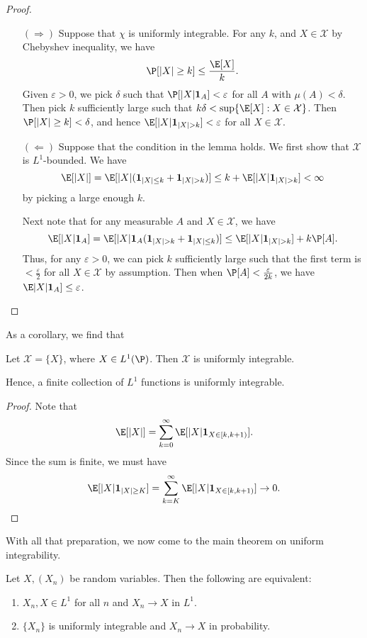 \documentclass[a4paper]{article}
\begin{document}
\begin{proof}\leavevmode
  \begin{itemize}
    \item[$(\Rightarrow)$] Suppose that $\chi$ is uniformly integrable. For any $k$, and $X \in \mathcal{X}$ by Chebyshev inequality, we have
      \[
        \P[|X| \geq k] \leq \frac{\E[X]}{k}.
      \]
      Given $\varepsilon > 0$, we pick $\delta$ such that $\P[|X| \mathbf{1}_A] < \varepsilon$ for all $A$ with $\mu(A) < \delta$. Then pick $k$ sufficiently large such that $k \delta < \sup\{\E[X]: X \in \mathcal{X}\}$. Then $\P[|X| \geq k] < \delta$, and hence $\E[|X|\mathbf{1}_{|X| > k}] < \varepsilon$ for all $X \in \mathcal{X}$.
    \item[$(\Leftarrow)$] Suppose that the condition in the lemma holds. We first show that $\mathcal{X}$ is $L^1$-bounded. We have
      \[
        \E[|X|] = \E[|X|(\mathbf{1}_{|X| \leq k} + \mathbf{1}_{|X| > k})] \leq k + \E[|X| \mathbf{1}_{|X| > k}] < \infty
      \]
      by picking a large enough $k$.

      Next note that for any measurable $A$ and $X \in \mathcal{X}$, we have
      \[
        \E[|X| \mathbf{1}_A] = \E[|X| \mathbf{1}_A(\mathbf{1}_{|X| > k} + \mathbf{1}_{|X| \leq k})] \leq \E[|X| \mathbf{1}_{|X| > k}] + k \P[A].
      \]
      Thus, for any $\varepsilon > 0$, we can pick $k$ sufficiently large such that the first term is $< \frac{\varepsilon}{2}$ for all $X \in \mathcal{X}$ by assumption. Then when $\P[A] < \frac{\varepsilon}{2k}$, we have $\E|X| \mathbf{1}_A] \leq \varepsilon$.
  \end{itemize}
\end{proof}

As a corollary, we find that
\begin{cor}
  Let $\mathcal{X} = \{X\}$, where $X \in L^1(\P)$. Then $\mathcal{X}$ is uniformly integrable.

  Hence, a finite collection of $L^1$ functions is uniformly integrable.
\end{cor}

\begin{proof}
   Note that
   \[
     \E[|X|] = \sum_{k = 0}^\infty \E[|X| \mathbf{1}_{X \in [k, k + 1)}].
   \]
   Since the sum is finite, we must have
   \[
     \E[|X|\mathbf{1}_{|X| \geq K}] = \sum_{k = K}^\infty \E[|X| \mathbf{1}_{X \in [k, k + 1)}] \to 0.
  \]
\end{proof}

With all that preparation, we now come to the main theorem on uniform integrability.
\begin{thm}
  Let $X, (X_n)$ be random variables. Then the following are equivalent:
  \begin{enumerate}
    \item $X_n, X \in L^1$ for all $n$ and $X_n \to X$ in $L^1$.
    \item $\{X_n\}$ is uniformly integrable and $X_n \to X$ in probability.
  \end{enumerate}
\end{thm}
\end{document}
